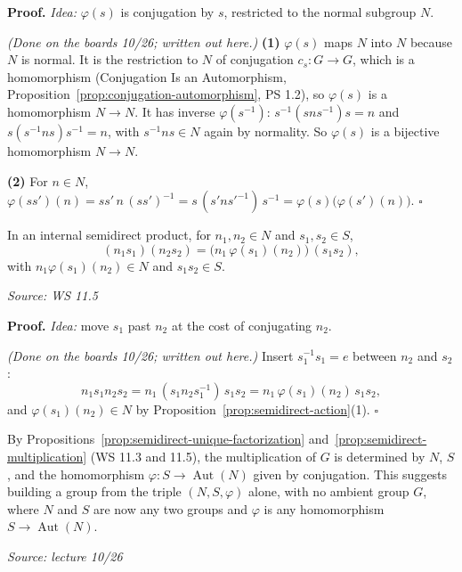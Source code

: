 \documentclass[11pt]{report}
\renewenvironment{proof}[1][Proof]{\noindent\textbf{#1.} }{\hfill$\square$\par\vspace{5pt}}
\newcommand{\srcline}[1]{\par\hfill{\footnotesize\textit{Source: #1}}}
\begin{document}
\begin{proof}
\textit{Idea:} $\varphi(s)$ is conjugation by $s$, restricted to the normal subgroup $N$.\par
\textit{(Done on the boards 10/26; written out here.)} \textbf{(1)} $\varphi(s)$ maps $N$ into $N$ because $N$ is normal. It is the restriction to $N$ of conjugation $c_s: G \to G$, which is a homomorphism (Conjugation Is an Automorphism, Proposition~\ref{prop:conjugation-automorphism}, PS 1.2), so $\varphi(s)$ is a homomorphism $N \to N$. It has inverse $\varphi(s^{-1})$: $s^{-1}(sns^{-1})s = n$ and $s(s^{-1}ns)s^{-1} = n$, with $s^{-1}ns \in N$ again by normality. So $\varphi(s)$ is a bijective homomorphism $N \to N$.

\textbf{(2)} For $n \in N$, $\varphi(ss')(n) = ss'\,n\,(ss')^{-1} = s\,(s'ns'^{-1})\,s^{-1} = \varphi(s)\big(\varphi(s')(n)\big)$.
\end{proof}

\begin{propbox}\label{prop:semidirect-multiplication}
In an internal semidirect product, for $n_1, n_2 \in N$ and $s_1, s_2 \in S$,
\[ (n_1s_1)(n_2s_2) = \big(n_1\,\varphi(s_1)(n_2)\big)\,(s_1s_2), \]
with $n_1\varphi(s_1)(n_2) \in N$ and $s_1s_2 \in S$.
\srcline{WS 11.5}
\end{propbox}

\begin{proof}
\textit{Idea:} move $s_1$ past $n_2$ at the cost of conjugating $n_2$.\par
\textit{(Done on the boards 10/26; written out here.)} Insert $s_1^{-1}s_1 = e$ between $n_2$ and $s_2$:
\[ n_1s_1n_2s_2 = n_1\,(s_1n_2s_1^{-1})\,s_1s_2 = n_1\,\varphi(s_1)(n_2)\,s_1s_2, \]
and $\varphi(s_1)(n_2) \in N$ by Proposition~\ref{prop:semidirect-action}(1).
\end{proof}

\begin{rembox}\label{rem:semidirect-data}
By Propositions~\ref{prop:semidirect-unique-factorization} and~\ref{prop:semidirect-multiplication} (WS 11.3 and 11.5), the multiplication of $G$ is determined by $N$, $S$, and the homomorphism $\varphi: S \to \operatorname{Aut}(N)$ given by conjugation. This suggests building a group from the triple $(N, S, \varphi)$ alone, with no ambient group $G$, where $N$ and $S$ are now any two groups and $\varphi$ is any homomorphism $S \to \operatorname{Aut}(N)$.
\srcline{lecture 10/26}
\end{rembox}
\end{document}
